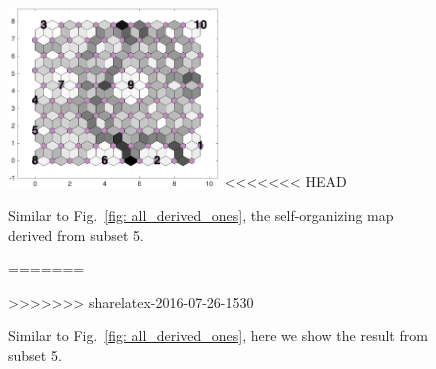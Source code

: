\begin{figure}
        \centering
        \includegraphics[width=0.5\textwidth]{../../images0.01/M31/2D/image_subsets/subset3_dist_with_hits_t.png}
<<<<<<< HEAD
    \caption{Similar to Fig.~\ref{fig: all_derived_ones}, the self-organizing map derived from subset 5.}
=======
    \caption{Similar to Fig.~\ref{fig: all_derived_ones}, here we show the result from subset 5.}
>>>>>>> sharelatex-2016-07-26-1530
    \label{fig: subset3}
\end{figure}

